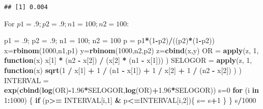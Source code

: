 \documentclass[]{article}
\newenvironment{Shaded}{\begin{snugshade}}{\end{snugshade}}
\newcommand{\KeywordTok}[1]{\textcolor[rgb]{0.13,0.29,0.53}{\textbf{#1}}}
\newcommand{\DecValTok}[1]{\textcolor[rgb]{0.00,0.00,0.81}{#1}}
\newcommand{\FloatTok}[1]{\textcolor[rgb]{0.00,0.00,0.81}{#1}}
\newcommand{\StringTok}[1]{\textcolor[rgb]{0.31,0.60,0.02}{#1}}
\newcommand{\ControlFlowTok}[1]{\textcolor[rgb]{0.13,0.29,0.53}{\textbf{#1}}}
\newcommand{\OperatorTok}[1]{\textcolor[rgb]{0.81,0.36,0.00}{\textbf{#1}}}
\newcommand{\NormalTok}[1]{#1}
\begin{document}
\begin{verbatim}
## [1] 0.004
\end{verbatim}

For \(p1 = .9; p2 = .9; n1 = 100; n2 = 100\):

\begin{Shaded}
\begin{Highlighting}[]
\NormalTok{p1 =}\StringTok{ }\NormalTok{.}\DecValTok{9}\NormalTok{; p2 =}\StringTok{ }\NormalTok{.}\DecValTok{9}\NormalTok{; n1 =}\StringTok{ }\DecValTok{100}\NormalTok{; n2 =}\StringTok{ }\DecValTok{100}
\NormalTok{p =}\StringTok{ }\NormalTok{p1}\OperatorTok{*}\NormalTok{(}\DecValTok{1}\OperatorTok{-}\NormalTok{p2)}\OperatorTok{/}\NormalTok{((p2)}\OperatorTok{*}\NormalTok{(}\DecValTok{1}\OperatorTok{-}\NormalTok{p2))}
\NormalTok{x=}\KeywordTok{rbinom}\NormalTok{(}\DecValTok{1000}\NormalTok{,n1,p1)}
\NormalTok{y=}\KeywordTok{rbinom}\NormalTok{(}\DecValTok{1000}\NormalTok{,n2,p2)}
\NormalTok{z=}\KeywordTok{cbind}\NormalTok{(x,y)}
\NormalTok{OR =}\StringTok{ }\KeywordTok{apply}\NormalTok{(z, }\DecValTok{1}\NormalTok{, }\ControlFlowTok{function}\NormalTok{(x) x[}\DecValTok{1}\NormalTok{] }\OperatorTok{*}\StringTok{ }\NormalTok{(n2 }\OperatorTok{-}\StringTok{ }\NormalTok{x[}\DecValTok{2}\NormalTok{]) }\OperatorTok{/}\StringTok{ }\NormalTok{(x[}\DecValTok{2}\NormalTok{] }\OperatorTok{*}\StringTok{ }\NormalTok{(n1 }\OperatorTok{-}\StringTok{ }\NormalTok{x[}\DecValTok{1}\NormalTok{])) )}
\NormalTok{SELOGOR =}\StringTok{ }\KeywordTok{apply}\NormalTok{(z, }\DecValTok{1}\NormalTok{, }\ControlFlowTok{function}\NormalTok{(x) }\KeywordTok{sqrt}\NormalTok{(}\DecValTok{1} \OperatorTok{/}\StringTok{ }\NormalTok{x[}\DecValTok{1}\NormalTok{] }\OperatorTok{+}\StringTok{ }\DecValTok{1} \OperatorTok{/}\StringTok{ }\NormalTok{(n1 }\OperatorTok{-}\StringTok{ }\NormalTok{x[}\DecValTok{1}\NormalTok{]) }\OperatorTok{+}\StringTok{ }\DecValTok{1} \OperatorTok{/}\StringTok{ }\NormalTok{x[}\DecValTok{2}\NormalTok{] }\OperatorTok{+}\StringTok{ }\DecValTok{1} \OperatorTok{/}\StringTok{ }\NormalTok{(n2 }\OperatorTok{-}\StringTok{ }\NormalTok{x[}\DecValTok{2}\NormalTok{]) ) )}
\NormalTok{INTERVAL =}\StringTok{ }\KeywordTok{exp}\NormalTok{(}\KeywordTok{cbind}\NormalTok{(}\KeywordTok{log}\NormalTok{(OR)}\OperatorTok{-}\FloatTok{1.96}\OperatorTok{*}\NormalTok{SELOGOR,}\KeywordTok{log}\NormalTok{(OR)}\OperatorTok{+}\FloatTok{1.96}\OperatorTok{*}\NormalTok{SELOGOR))}
\NormalTok{s=}\DecValTok{0}
\ControlFlowTok{for}\NormalTok{ (i }\ControlFlowTok{in} \DecValTok{1}\OperatorTok{:}\DecValTok{1000}\NormalTok{) \{}
  \ControlFlowTok{if}\NormalTok{ (p}\OperatorTok{>=}\StringTok{ }\NormalTok{INTERVAL[i,}\DecValTok{1}\NormalTok{] }\OperatorTok{&}\StringTok{ }\NormalTok{p}\OperatorTok{<=}\NormalTok{INTERVAL[i,}\DecValTok{2}\NormalTok{])\{}
\NormalTok{    s=}\StringTok{ }\NormalTok{s}\OperatorTok{+}\DecValTok{1}
\NormalTok{  \}}
\NormalTok{\}}
\NormalTok{s}\OperatorTok{/}\DecValTok{1000}
\end{Highlighting}
\end{Shaded}
\end{document}
